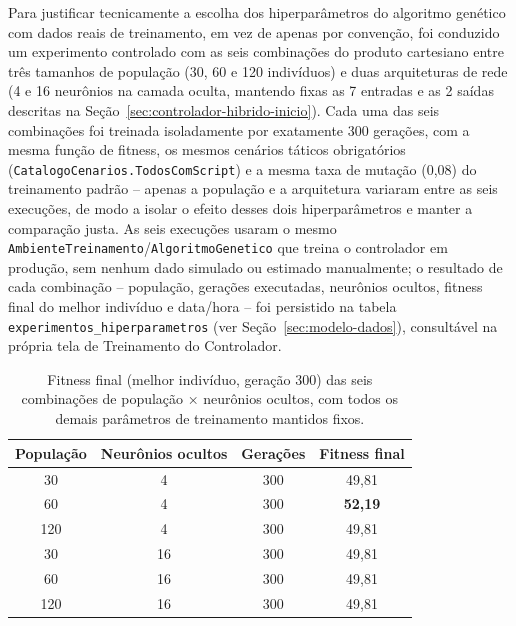 \documentclass[12pt,a4paper]{article}
\begin{document}
Para justificar tecnicamente a escolha dos hiperparâmetros do algoritmo genético com dados reais de
treinamento, em vez de apenas por convenção, foi conduzido um experimento controlado com as seis
combinações do produto cartesiano entre três tamanhos de população (30, 60 e 120 indivíduos) e duas
arquiteturas de rede (4 e 16 neurônios na camada oculta, mantendo fixas as 7 entradas e as 2 saídas
descritas na Seção~\ref{sec:controlador-hibrido-inicio}). Cada uma das seis combinações foi treinada
isoladamente por exatamente 300 gerações, com a mesma função de fitness, os mesmos cenários táticos
obrigatórios (\texttt{CatalogoCenarios.TodosComScript}) e a mesma taxa de mutação (0,08) do
treinamento padrão -- apenas a população e a arquitetura variaram entre as seis execuções, de modo a
isolar o efeito desses dois hiperparâmetros e manter a comparação justa. As seis execuções usaram o
mesmo \texttt{AmbienteTreinamento}/\texttt{AlgoritmoGenetico} que treina o controlador em produção,
sem nenhum dado simulado ou estimado manualmente; o resultado de cada combinação -- população,
gerações executadas, neurônios ocultos, fitness final do melhor indivíduo e data/hora -- foi
persistido na tabela \texttt{experimentos\_hiperparametros} (ver Seção~\ref{sec:modelo-dados}),
consultável na própria tela de Treinamento do Controlador.

\begin{table}[htbp]
  \centering
  \caption{Fitness final (melhor indivíduo, geração 300) das seis combinações de população ×
  neurônios ocultos, com todos os demais parâmetros de treinamento mantidos fixos.}
  \label{tab:experimento-hiperparametros}
  \small
  \renewcommand{\arraystretch}{1.3}
  \begin{tabular}{cccc}
    \toprule
    \rowcolor{gray!15}
    \textbf{População} & \textbf{Neurônios ocultos} & \textbf{Gerações} & \textbf{Fitness final} \\
    \midrule
    30  & 4  & 300 & 49,81 \\
    \rowcolor{gray!8}
    60  & 4  & 300 & \textbf{52,19} \\
    120 & 4  & 300 & 49,81 \\
    \rowcolor{gray!8}
    30  & 16 & 300 & 49,81 \\
    60  & 16 & 300 & 49,81 \\
    \rowcolor{gray!8}
    120 & 16 & 300 & 49,81 \\
    \bottomrule
  \end{tabular}
\end{table}
\end{document}
